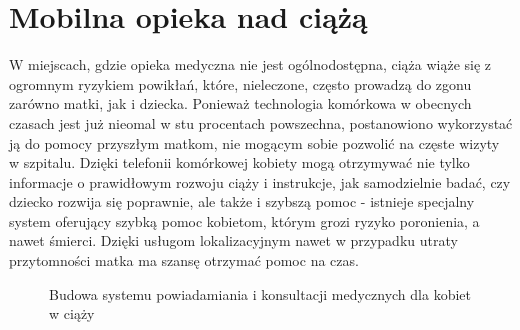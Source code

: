 \section{Mobilna opieka nad ciążą}
W miejscach, gdzie opieka medyczna nie jest ogólnodostępna, ciąża wiąże się z ogromnym ryzykiem powikłań, które, nieleczone, często prowadzą do zgonu zarówno matki, jak i dziecka. Ponieważ technologia komórkowa w obecnych czasach jest już nieomal w stu procentach powszechna, postanowiono wykorzystać ją do pomocy przyszłym matkom, nie mogącym sobie pozwolić na częste wizyty w szpitalu. Dzięki telefonii komórkowej kobiety mogą otrzymywać nie tylko informacje o prawidłowym rozwoju ciąży i instrukcje, jak samodzielnie badać, czy dziecko rozwija się poprawnie, ale także i szybszą pomoc - istnieje specjalny system \cite{Ismaeel2013EffectiveSystemforPregnantWomenusingMobileGIS} oferujący szybką pomoc kobietom, którym grozi ryzyko poronienia, a nawet śmierci. Dzięki usługom lokalizacyjnym nawet w przypadku utraty przytomności matka ma szansę otrzymać pomoc na czas.
\begin{figure}[ht!]
  \centering
  \caption{Budowa systemu powiadamiania i konsultacji medycznych dla kobiet w ciąży}
\end{figure}